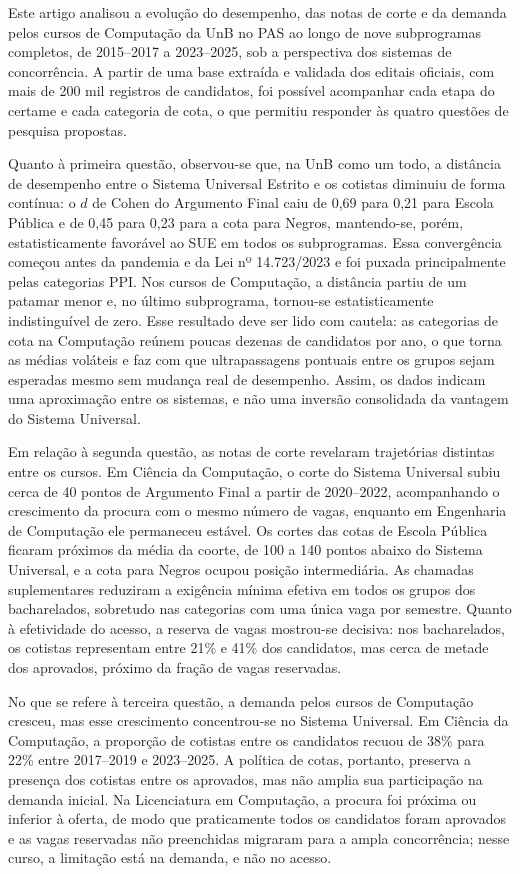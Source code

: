 \documentclass[12pt]{article}
\begin{document}
Este artigo analisou a evolução do desempenho, das notas de corte e da demanda pelos cursos de Computação da UnB no PAS ao longo de nove subprogramas completos, de 2015--2017 a 2023--2025, sob a perspectiva dos sistemas de concorrência. A partir de uma base extraída e validada dos editais oficiais, com mais de 200 mil registros de candidatos, foi possível acompanhar cada etapa do certame e cada categoria de cota, o que permitiu responder às quatro questões de pesquisa propostas.

Quanto à primeira questão, observou-se que, na UnB como um todo, a distância de desempenho entre o Sistema Universal Estrito e os cotistas diminuiu de forma contínua: o $d$ de Cohen do Argumento Final caiu de 0,69 para 0,21 para Escola Pública e de 0,45 para 0,23 para a cota para Negros, mantendo-se, porém, estatisticamente favorável ao SUE em todos os subprogramas. Essa convergência começou antes da pandemia e da Lei nº 14.723/2023 e foi puxada principalmente pelas categorias PPI. Nos cursos de Computação, a distância partiu de um patamar menor e, no último subprograma, tornou-se estatisticamente indistinguível de zero. Esse resultado deve ser lido com cautela: as categorias de cota na Computação reúnem poucas dezenas de candidatos por ano, o que torna as médias voláteis e faz com que ultrapassagens pontuais entre os grupos sejam esperadas mesmo sem mudança real de desempenho. Assim, os dados indicam uma aproximação entre os sistemas, e não uma inversão consolidada da vantagem do Sistema Universal.

Em relação à segunda questão, as notas de corte revelaram trajetórias distintas entre os cursos. Em Ciência da Computação, o corte do Sistema Universal subiu cerca de 40 pontos de Argumento Final a partir de 2020--2022, acompanhando o crescimento da procura com o mesmo número de vagas, enquanto em Engenharia de Computação ele permaneceu estável. Os cortes das cotas de Escola Pública ficaram próximos da média da coorte, de 100 a 140 pontos abaixo do Sistema Universal, e a cota para Negros ocupou posição intermediária. As chamadas suplementares reduziram a exigência mínima efetiva em todos os grupos dos bacharelados, sobretudo nas categorias com uma única vaga por semestre. Quanto à efetividade do acesso, a reserva de vagas mostrou-se decisiva: nos bacharelados, os cotistas representam entre 21\% e 41\% dos candidatos, mas cerca de metade dos aprovados, próximo da fração de vagas reservadas.

No que se refere à terceira questão, a demanda pelos cursos de Computação cresceu, mas esse crescimento concentrou-se no Sistema Universal. Em Ciência da Computação, a proporção de cotistas entre os candidatos recuou de 38\% para 22\% entre 2017--2019 e 2023--2025. A política de cotas, portanto, preserva a presença dos cotistas entre os aprovados, mas não amplia sua participação na demanda inicial. Na Licenciatura em Computação, a procura foi próxima ou inferior à oferta, de modo que praticamente todos os candidatos foram aprovados e as vagas reservadas não preenchidas migraram para a ampla concorrência; nesse curso, a limitação está na demanda, e não no acesso.
\end{document}
